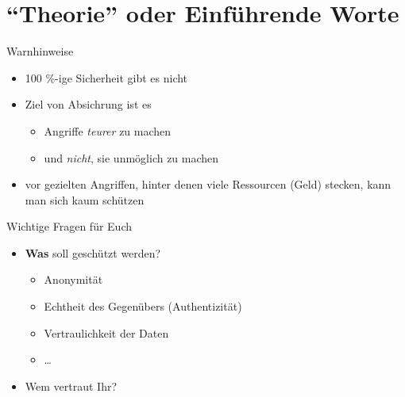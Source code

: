 \section{``Theorie'' oder Einführende Worte}
  \begin{frame}{Warnhinweise}
    \begin{itemize}
      \item 100 \%-ige Sicherheit gibt es nicht
      \item Ziel von Absichrung ist es
      \begin{itemize}
        \item Angriffe \textit{teurer} zu machen
        \item und \textit{nicht}, sie unmöglich zu machen
      \end{itemize}
      \item vor gezielten Angriffen, hinter denen viele Ressourcen (Geld) stecken, kann man sich kaum schützen
    \end{itemize}
  \end{frame}
  \begin{frame}{Wichtige Fragen für Euch}
    \begin{itemize}
      \item \textbf{Was} soll geschützt werden?
        \begin{itemize}
          \item Anonymität
          \item Echtheit des Gegenübers (Authentizität)
          \item Vertraulichkeit der Daten
          \item \ldots
        \end{itemize}
      \item Wem vertraut Ihr?
    \end{itemize}
  \end{frame}

